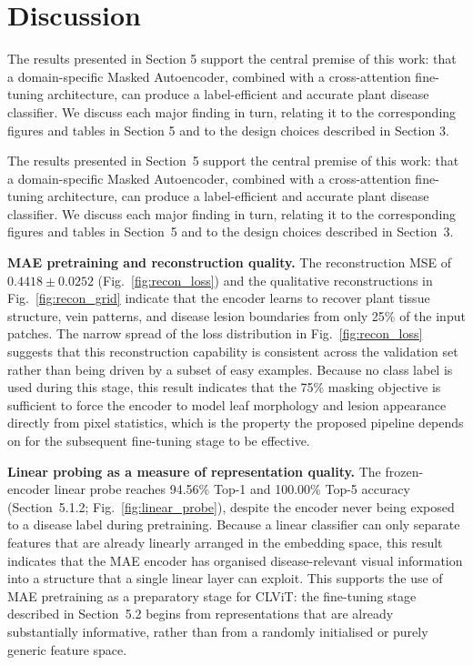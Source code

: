 \documentclass[conference]{IEEEtran}
\begin{document}
\section{Discussion}

The results presented in Section 5 support the central
premise of this work: that a domain-specific Masked Autoencoder,
combined with a cross-attention fine-tuning architecture,
can produce a label-efficient and accurate plant disease
classifier. We discuss each major finding in turn, relating it to
the corresponding figures and tables in Section 5 and to the
design choices described in Section 3.

The results presented in Section~5 support the central premise of this work: that a domain-specific Masked Autoencoder, combined with a cross-attention fine-tuning architecture, can produce a label-efficient and accurate plant disease classifier. We discuss each major finding in turn, relating it to the corresponding figures and tables in Section~5 and to the design choices described in Section~3.

\textbf{MAE pretraining and reconstruction quality.}
The reconstruction MSE of $0.4418 \pm 0.0252$ (Fig.~\ref{fig:recon_loss}) and the qualitative reconstructions in Fig.~\ref{fig:recon_grid} indicate that the encoder learns to recover plant tissue structure, vein patterns, and disease lesion boundaries from only 25\% of the input patches. The narrow spread of the loss distribution in Fig.~\ref{fig:recon_loss} suggests that this reconstruction capability is consistent across the validation set rather than being driven by a subset of easy examples. Because no class label is used during this stage, this result indicates that the 75\% masking objective is sufficient to force the encoder to model leaf morphology and lesion appearance directly from pixel statistics, which is the property the proposed pipeline depends on for the subsequent fine-tuning stage to be effective.

\textbf{Linear probing as a measure of representation quality.}
The frozen-encoder linear probe reaches 94.56\% Top-1 and 100.00\% Top-5 accuracy (Section~5.1.2; Fig.~\ref{fig:linear_probe}), despite the encoder never being exposed to a disease label during pretraining. Because a linear classifier can only separate features that are already linearly arranged in the embedding space, this result indicates that the MAE encoder has organised disease-relevant visual information into a structure that a single linear layer can exploit. This supports the use of MAE pretraining as a preparatory stage for CLViT: the fine-tuning stage described in Section~5.2 begins from representations that are already substantially informative, rather than from a randomly initialised or purely generic feature space.
\end{document}
